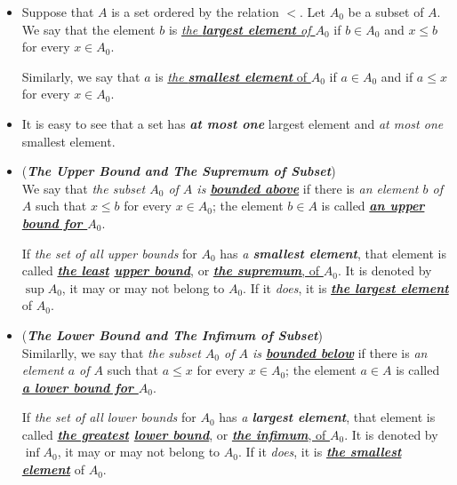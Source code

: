 \documentclass[11pt]{article}
\begin{document}
\begin{itemize}
\item \begin{definition}
Suppose that $A$ is a set ordered by the relation $<$.  Let $A_0$ be a subset of $A$. We say that the element $b$ is \underline{\emph{the \textbf{largest element} of $A_0$}} if $b \in A_0$ and $x \le b$ for every $x \in A_0$. 

Similarly, we say that $a$ is \underline{\emph{the \textbf{smallest element}} of $A_0$} if $a \in A_0$ and if $a \le x$
for every $x \in A_0$. 
\end{definition}

\item \begin{remark}
It is easy to see that a set has \emph{\textbf{at most one}} largest element and \emph{at most one} smallest element.
\end{remark}

\item \begin{definition} (\emph{\textbf{The Upper Bound and The Supremum of Subset}})\\
We say that \emph{the subset $A_0$ of $A$ is \underline{\textbf{bounded above}}} if there is \emph{an element $b$ of $A$} such that $x \le b$ for every $x \in A_0$; the element $b \in A$ is called \underline{\emph{\textbf{an upper bound for $A_0$}}}. 

If \emph{the set of all upper bounds} for $A_0$ has \emph{a \textbf{smallest element}}, that element is called \emph{\textbf{\underline{the least} \underline{upper bound}}}, or \underline{\emph{\textbf{the supremum}}, of $A_0$}. It is denoted by $\sup A_0$, it may or may not belong to $A_0$. If it \emph{does}, it is \emph{\textbf{\underline{the largest element}}} of $A_0$.
\end{definition}

\item \begin{definition} (\emph{\textbf{The Lower Bound and The Infimum of Subset}})\\
Similarlly, we say that \emph{the subset $A_0$ of $A$ is \underline{\textbf{bounded below}}} if there is \emph{an element $a$ of $A$} such that $a \le x$ for every $x \in A_0$; the element $a \in A$ is called \underline{\emph{\textbf{a lower bound for $A_0$}}}. 

If \emph{the set of all lower bounds} for $A_0$ has \emph{a \textbf{largest element}}, that element is called \emph{\textbf{\underline{the greatest} \underline{lower bound}}}, or \underline{\emph{\textbf{the infimum}}, of $A_0$}. It is denoted by $\inf A_0$, it may or may not belong to $A_0$. If it \emph{does}, it is \emph{\textbf{\underline{the smallest element}}} of $A_0$.
\end{definition}


\end{itemize}
\end{document}
